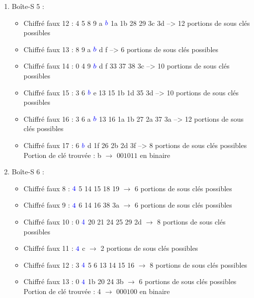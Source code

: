 \documentclass[11pt]{article}
\begin{document}
\begin{enumerate}
\item Boîte-S 5 : 
\begin{itemize}
	\item Chiffré faux 12 : 4 5 8 9 a $\color{blue}b$ 1a 1b 28 29 3c 3d --> 12 portions de sous clés possibles
	\item Chiffré faux 13 : 8 9 a $\color{blue}b$ d f --> 6 portions de sous clés possibles
	\item Chiffré faux 14 : 0 4 9 $\color{blue}b$ d f 33 37 38 3c --> 10 portions de sous clés possibles
	\item Chiffré faux 15 : 3 6 $\color{blue}b$ e 13 15 1b 1d 35 3d --> 10 portions de sous clés possibles
	\item Chiffré faux 16 : 3 6 a $\color{blue}b$ 13 16 1a 1b 27 2a 37 3a --> 12 portions de sous clés possibles
	\item Chiffré faux 17 : 6 $\color{blue}b$ d 1f 26 2b 2d 3f --> 8 portions de sous clés possibles \newline
	Portion de clé trouvée : b $\longrightarrow$ $001011$ en binaire
\end{itemize}

\item Boîte-S 6 : 
\begin{itemize}
	\item Chiffré faux 8 : $\color{blue}4$ 5 14 15 18 19 $\longrightarrow$ 6 portions de sous clés possibles
	\item Chiffré faux 9 : $\color{blue}4$ 6 14 16 38 3a $\longrightarrow$ 6 portions de sous clés possibles
	\item Chiffré faux 10 : 0 $\color{blue}4$ 20 21 24 25 29 2d $\longrightarrow$ 8 portions de sous clés possibles
	\item Chiffré faux 11 : $\color{blue}4$ c $\longrightarrow$ 2 portions de sous clés possibles
	\item Chiffré faux 12 : 3 $\color{blue}4$ 5 6 13 14 15 16 $\longrightarrow$ 8 portions de sous clés possibles
	\item Chiffré faux 13 : 0 $\color{blue}4$ 1b 20 24 3b $\longrightarrow$ 6 portions de sous clés possibles \newline
	Portion de clé trouvée : 4 $\longrightarrow$ $000100$ en binaire
\end{itemize}


\end{enumerate}
\end{document}
